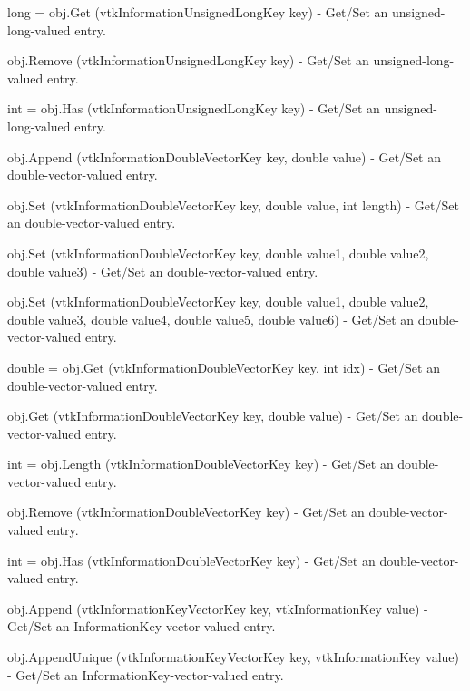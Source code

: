 \begin{DoxyItemize}
\item {\ttfamily long = obj.\-Get (vtk\-Information\-Unsigned\-Long\-Key key)} -\/ Get/\-Set an unsigned-\/long-\/valued entry.  
\item {\ttfamily obj.\-Remove (vtk\-Information\-Unsigned\-Long\-Key key)} -\/ Get/\-Set an unsigned-\/long-\/valued entry.  
\item {\ttfamily int = obj.\-Has (vtk\-Information\-Unsigned\-Long\-Key key)} -\/ Get/\-Set an unsigned-\/long-\/valued entry.  
\item {\ttfamily obj.\-Append (vtk\-Information\-Double\-Vector\-Key key, double value)} -\/ Get/\-Set an double-\/vector-\/valued entry.  
\item {\ttfamily obj.\-Set (vtk\-Information\-Double\-Vector\-Key key, double value, int length)} -\/ Get/\-Set an double-\/vector-\/valued entry.  
\item {\ttfamily obj.\-Set (vtk\-Information\-Double\-Vector\-Key key, double value1, double value2, double value3)} -\/ Get/\-Set an double-\/vector-\/valued entry.  
\item {\ttfamily obj.\-Set (vtk\-Information\-Double\-Vector\-Key key, double value1, double value2, double value3, double value4, double value5, double value6)} -\/ Get/\-Set an double-\/vector-\/valued entry.  
\item {\ttfamily double = obj.\-Get (vtk\-Information\-Double\-Vector\-Key key, int idx)} -\/ Get/\-Set an double-\/vector-\/valued entry.  
\item {\ttfamily obj.\-Get (vtk\-Information\-Double\-Vector\-Key key, double value)} -\/ Get/\-Set an double-\/vector-\/valued entry.  
\item {\ttfamily int = obj.\-Length (vtk\-Information\-Double\-Vector\-Key key)} -\/ Get/\-Set an double-\/vector-\/valued entry.  
\item {\ttfamily obj.\-Remove (vtk\-Information\-Double\-Vector\-Key key)} -\/ Get/\-Set an double-\/vector-\/valued entry.  
\item {\ttfamily int = obj.\-Has (vtk\-Information\-Double\-Vector\-Key key)} -\/ Get/\-Set an double-\/vector-\/valued entry.  
\item {\ttfamily obj.\-Append (vtk\-Information\-Key\-Vector\-Key key, vtk\-Information\-Key value)} -\/ Get/\-Set an Information\-Key-\/vector-\/valued entry.  
\item {\ttfamily obj.\-Append\-Unique (vtk\-Information\-Key\-Vector\-Key key, vtk\-Information\-Key value)} -\/ Get/\-Set an Information\-Key-\/vector-\/valued entry.  

\end{DoxyItemize}
